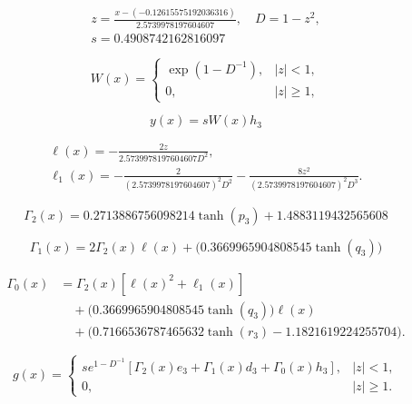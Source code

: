 \begin{equation}
\begin{aligned}z=\frac{x-(-0.12615575192036316)}{2.5739978197604607},\quad D=1-z^2,\\s=0.4908742162816097\end{aligned}
\end{equation}


\begin{equation}
W(x)=\begin{cases}\exp(1-D^{-1}),&|z|<1,\\0,&|z|\ge1,\end{cases}
\end{equation}


\begin{equation}\label{eq:ex2-solution}
y(x)=sW(x)h_{3}
\end{equation}


\begin{equation}
\begin{aligned}\ell(x)=-\frac{2z}{2.5739978197604607D^2},\\\ell_1(x)=-\frac{2}{(2.5739978197604607)^2D^2}-\frac{8z^2}{(2.5739978197604607)^2D^3}.\end{aligned}
\end{equation}


\begin{equation}
\Gamma_2(x)=0.2713886756098214 \tanh{\left(p_{3} \right)} + 1.4883119432565608
\end{equation}


\begin{equation}
\Gamma_1(x)=2\Gamma_2(x)\ell(x)+\bigl(0.3669965904808545 \tanh{\left(q_{3} \right)}\bigr)
\end{equation}


\begin{equation}
\begin{aligned}\Gamma_0(x)&=\Gamma_2(x)[\ell(x)^2+\ell_1(x)]\\&\quad+\bigl(0.3669965904808545 \tanh{\left(q_{3} \right)}\bigr)\ell(x)\\&\quad+\bigl(0.7166536787465632 \tanh{\left(r_{3} \right)} - 1.1821619224255704\bigr).\end{aligned}
\end{equation}


\begin{equation}\label{eq:ex2-forcing}
g(x)=\begin{cases}s e^{1-D^{-1}}[\Gamma_2(x)e_{3}+\Gamma_1(x)d_{3}+\Gamma_0(x)h_{3}],&|z|<1,\\0,&|z|\ge1.\end{cases}
\end{equation}


